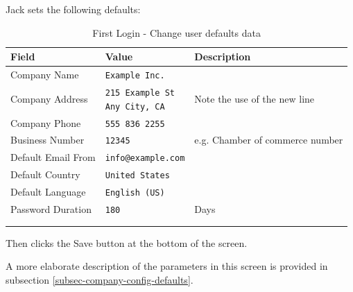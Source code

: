 Jack sets the following defaults:
\begin{longtable}{ llp{6cm} }
        Field & Value & Description \\ \hline
        \endhead
        Company Name & \texttt{Example Inc.} & \\
        Company Address &  \makecell[l]{\texttt{215 Example St} \\  \texttt{Any City, CA}} & Note the use of the new line\\
        Company Phone &  \texttt{555 836 2255} & \\
        Business Number &  \texttt{12345} & e.g. Chamber of commerce number\\
        Default Email \index{email} From & \texttt{info@example.com} & \\
        Default Country & \texttt{United States}  & \\
        Default Language &  \texttt{English (US)} & \\
        Password Duration &  \texttt{180} & Days\\
        \\
\caption{First Login - Change user defaults data}
\label{fig:first-user-user-default-data}
\end{longtable}


Then clicks the Save button at the bottom of the screen.

A more elaborate description of the parameters in this screen is provided in subsection
\ref{subsec-company-config-defaults}.

